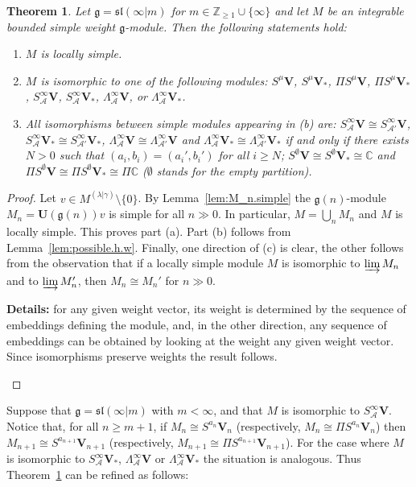 \documentclass[12pt]{amsart}
\newcommand\C{\mathbb{C}}
\newcommand\Z{\mathbb{Z}}
\newcommand\g{\mathfrak{g}}
\newcommand\fsl{\mathfrak{sl}}
\newcommand\cA{\mathcal{A}}
\newcommand\bV{\mathbf{V}}
\newcommand\bU{\mathbf{U}}
\theoremstyle{plain}
\newtheorem{theo}{Theorem}[section]
\theoremstyle{definition}
\numberwithin{equation}{section}
\newcommand{\details}[1]{\smallskip \color{blue} \begin{footnotesize} \textbf{Details:} #1 \end{footnotesize} \color{black}}
\newcommand{\details}[1]{}
\begin{document}
\begin{theo}\label{thm:classification.sl.case}
Let $\g = \fsl(\infty|m)$ for $m\in \Z_{\geq 1}\cup\{\infty\}$ and let $M$ be an integrable bounded simple weight $\g$-module. Then the following statements hold:
\begin{enumerate}
\item $M$ is locally simple.
\item $M$ is isomorphic to one of the following modules: $S^\mu \bV$, $S^\mu \bV_*$, $\Pi S^\mu \bV$, $\Pi S^\mu \bV_*$, $S_\cA^\infty \bV$, $S_\cA^\infty \bV_*$, $\Lambda_\cA^{\infty} \bV$, or $\Lambda_\cA^{\infty} \bV_*$.
\item All isomorphisms between simple modules appearing in (b) are: $S_\cA^\infty\bV\cong S_{\cA'}^\infty\bV$, $S_\cA^\infty\bV_*\cong S_{\cA'}^\infty\bV_*$, $\Lambda_\cA^\infty\bV\cong \Lambda_{\cA'}^\infty\bV$ and $\Lambda_\cA^\infty\bV_*\cong \Lambda_{\cA'}^\infty\bV_*$ if and only if there exists $N>0$ such that $(a_i, b_i)=(a_i', b_i')$ for all $i\geq N$; $S^\emptyset \bV\cong S^\emptyset \bV_*\cong \C$ and $\Pi S^\emptyset \bV\cong \Pi S^\emptyset \bV_*\cong \Pi \C$ ($\emptyset$ stands for the empty partition).
\end{enumerate}
\end{theo}
\begin{proof}
Let $v\in M^{(\lambda | \gamma)}\setminus \{0\}$. By Lemma~\ref{lem:M_n.simple} the $\g(n)$-module $M_n = \bU(\g(n)) v$ is simple for all $n\gg 0$. In particular, $M = \bigcup_n M_n$ and $M$ is locally simple. This proves part (a). Part (b) follows from Lemma~\ref{lem:possible.h.w}. Finally, one direction of (c) is clear, the other follows from the observation that if a locally simple module $M$ is isomorphic to $\varinjlim M_n$ and to $\varinjlim M_n'$, then $M_n\cong M_n'$ for $n\gg 0$. \details{for any given weight vector, its weight is determined by the sequence of embeddings defining the module, and, in the other direction, any sequence of embeddings can be obtained by looking at the weight any given weight vector. Since isomorphisms preserve weights the result follows.}
\end{proof}

Suppose that $\g=\fsl(\infty|m)$ with $m<\infty$, and that $M$ is isomorphic to $S_\cA^\infty \bV$. Notice that, for all $n\geq m+1$, if $M_n\cong S^{a_n} \bV_n$ (respectively, $M_n\cong \Pi S^{a_n} \bV_n$) then $M_{n+1}\cong S^{a_{n+1}} \bV_{n+1}$ (respectively, $M_{n+1}\cong \Pi S^{a_{n+1}} \bV_{n+1}$). For the case where $M$ is isomorphic to $S_\cA^\infty \bV_*$, $\Lambda_\cA^{\infty} \bV$ or $\Lambda_\cA^{\infty} \bV_*$ the situation is analogous. Thus Theorem~\ref{thm:classification.sl.case} can be refined as follows:
\end{document}
